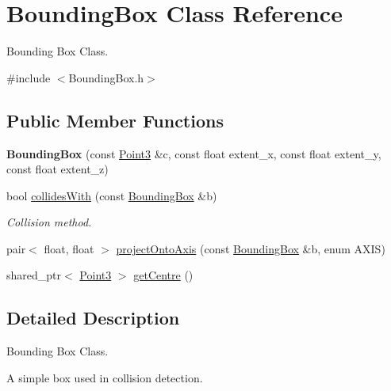 \hypertarget{classBoundingBox}{\section{Bounding\-Box Class Reference}
\label{classBoundingBox}
}


Bounding Box Class.  




{\ttfamily \#include $<$Bounding\-Box.\-h$>$}

\subsection*{Public Member Functions}
\begin{DoxyCompactItemize}
\item 
\hypertarget{classBoundingBox_af06000fc84c707ac6fc5451c63de3480}{{\bfseries Bounding\-Box} (const \hyperlink{classVectormath_1_1Aos_1_1Point3}{Point3} \&c, const float extent\-\_\-x, const float extent\-\_\-y, const float extent\-\_\-z)}\label{classBoundingBox_af06000fc84c707ac6fc5451c63de3480}

\item 
bool \hyperlink{classBoundingBox_a90418b763701826c706178845903dd7c}{collides\-With} (const \hyperlink{classBoundingBox}{Bounding\-Box} \&b)
\begin{DoxyCompactList}\small\item\em Collision method. \end{DoxyCompactList}\item 
pair$<$ float, float $>$ \hyperlink{classBoundingBox_a20a8d578fbfd1702e183921f9ec0a0d2}{project\-Onto\-Axis} (const \hyperlink{classBoundingBox}{Bounding\-Box} \&b, enum A\-X\-I\-S)
\item 
shared\-\_\-ptr$<$ \hyperlink{classVectormath_1_1Aos_1_1Point3}{Point3} $>$ \hyperlink{classBoundingBox_aceef7769498825680d34638bccc6f490}{get\-Centre} ()
\end{DoxyCompactItemize}


\subsection{Detailed Description}
Bounding Box Class. 

A simple box used in collision detection. 

